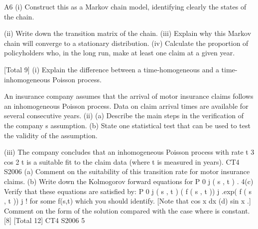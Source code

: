 \documentclass[a4paper,12pt]{article}
\begin{document}
A6
(i) Construct this as a Markov chain model, identifying clearly the states of the
chain.

(ii) Write down the transition matrix of the chain.
(iii) Explain why this Markov chain will converge to a stationary distribution. 
(iv) Calculate the proportion of policyholders who, in the long run, make at least
one claim at a given year.

[Total 9]
(i) Explain the difference between a time-homogeneous and a time-
inhomogeneous Poisson process.


An insurance company assumes that the arrival of motor insurance claims follows an
inhomogeneous Poisson process.
Data on claim arrival times are available for several consecutive years.
(ii)
(a) Describe the main steps in the verification of the company s
assumption.
(b) State one statistical test that can be used to test the validity of the
assumption.

(iii)
The company concludes that an inhomogeneous Poisson process with rate
t 3 cos 2 t is a suitable fit to the claim data (where t is measured in
years).
CT4 S2006
(a) Comment on the suitability of this transition rate for motor insurance
claims.
(b) Write down the Kolmogorov forward equations for P 0 j ( s , t ) .
4(c)
Verify that these equations are satisfied by:
P 0 j ( s , t )
( f ( s , t )) j .exp( f ( s , t ))
j !
for some f(s,t) which you should identify.
[Note that cos x dx
(d)
sin x .]
Comment on the form of the solution compared with the case where
is constant.
[8]
[Total 12]
CT4 S2006
5

\end{document}

